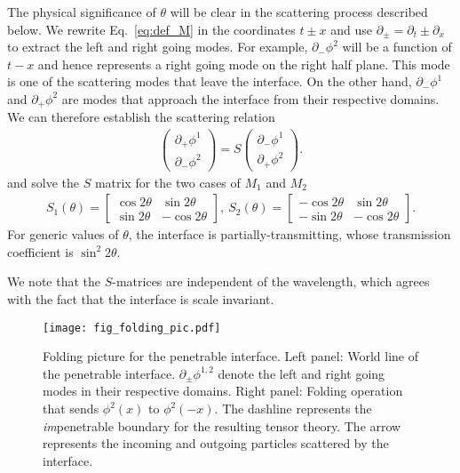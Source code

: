 The physical significance of $\theta$ will be clear in the scattering process described below. We rewrite Eq.~\eqref{eq:def_M} in the coordinates $t\pm x$ and use $\partial_{\pm} = \partial_{t} \pm \partial_x $ to extract the left and right going modes. For example, $\partial_{-} \phi^2$ will be a function of $t - x$ and hence represents a right going mode on the right half plane. This mode is one of the scattering modes that leave the interface. On the other hand, $\partial_{-} \phi^1$ and $\partial_{+} \phi^2$ are modes that approach the interface from their respective domains. We can therefore establish the scattering relation 
\begin{equation}\begin{aligned}
\label{eq:def_S}
\begin{pmatrix}
\partial_+\phi^1\\
\partial_-\phi^2
\end{pmatrix}
=S
\begin{pmatrix}
\partial_-\phi^1\\
\partial_+\phi^2
\end{pmatrix}.
\end{aligned}\end{equation}
and solve the $S$ matrix for the two cases of $M_1$ and $M_2$
\begin{equation}\begin{aligned}
\label{eq:S1_S2}
S_1(\theta)=\begin{bmatrix}
\cos 2\theta & \sin 2\theta \\
\sin 2\theta & -\cos 2\theta
\end{bmatrix},\
S_2(\theta)=\begin{bmatrix}
-\cos 2\theta & \sin 2\theta \\
-\sin 2\theta & -\cos 2\theta
\end{bmatrix}.
\end{aligned}\end{equation}
For generic values of $\theta$, the interface is partially-transmitting, whose transmission coefficient is $\sin^2 2 \theta$.

We note that the $S$-matrices are independent of the wavelength, which agrees with the fact that the interface is scale invariant. 
\begin{figure}[h]
\centering
\texttt{[image: fig\_folding\_pic.pdf]}
\caption{Folding picture for the penetrable interface. Left panel: World line of the penetrable interface. $\partial_\pm\phi^{1,2}$ denote the left and right going modes in their respective domains. Right panel: Folding operation that sends $\phi^2(x)$ to $\phi^2(-x)$. The dashline represents the \emph{im}penetrable boundary for the resulting tensor theory. The arrow represents the incoming and outgoing particles scattered by the interface.}
\label{fig:folding_pic}
\end{figure}

